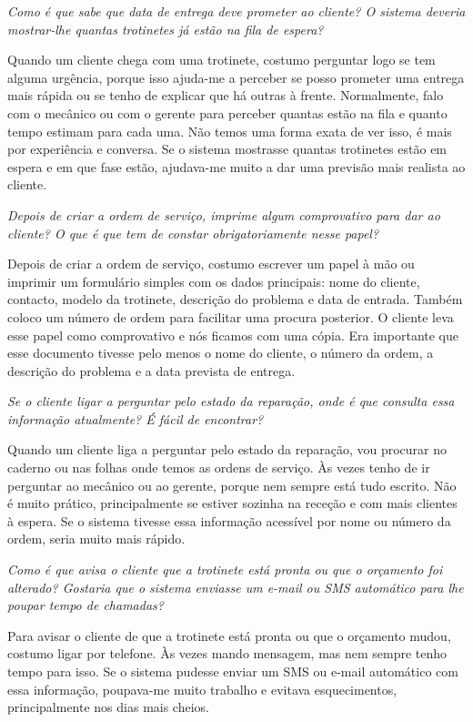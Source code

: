 \documentclass[11pt,a4paper]{article}
\newcommand{\pergunta}[1]{\item[P:] \textit{#1}}
\newcommand{\resposta}[1]{\item[R:] #1}
\begin{document}
\begin{transcription}
		\pergunta{Como é que sabe que data de entrega deve prometer ao cliente? O sistema deveria mostrar-lhe quantas trotinetes já estão na fila de espera?}
		\resposta{Quando um cliente chega com uma trotinete, costumo perguntar logo se tem alguma urgência, porque isso ajuda-me a perceber se posso prometer uma entrega mais rápida ou se tenho de explicar que há outras à frente. Normalmente, falo com o mecânico ou com o gerente para perceber quantas estão na fila e quanto tempo estimam para cada uma. Não temos uma forma exata de ver isso, é mais por experiência e conversa. Se o sistema mostrasse quantas trotinetes estão em espera e em que fase estão, ajudava-me muito a dar uma previsão mais realista ao cliente.}
		
		\pergunta{Depois de criar a ordem de serviço, imprime algum comprovativo para dar ao cliente? O que é que tem de constar obrigatoriamente nesse papel?}
		\resposta{Depois de criar a ordem de serviço, costumo escrever um papel à mão ou imprimir um formulário simples com os dados principais: nome do cliente, contacto, modelo da trotinete, descrição do problema e data de entrada. Também coloco um número de ordem para facilitar uma procura posterior. O cliente leva esse papel como comprovativo e nós ficamos com uma cópia. Era importante que esse documento tivesse pelo menos o nome do cliente, o número da ordem, a descrição do problema e a data prevista de entrega.}
		
		\pergunta{Se o cliente ligar a perguntar pelo estado da reparação, onde é que consulta essa informação atualmente? É fácil de encontrar?}
		\resposta{Quando um cliente liga a perguntar pelo estado da reparação, vou procurar no caderno ou nas folhas onde temos as ordens de serviço. Às vezes tenho de ir perguntar ao mecânico ou ao gerente, porque nem sempre está tudo escrito. Não é muito prático, principalmente se estiver sozinha na receção e com mais clientes à espera. Se o sistema tivesse essa informação acessível por nome ou número da ordem, seria muito mais rápido.}
		
		\pergunta{Como é que avisa o cliente que a trotinete está pronta ou que o orçamento foi alterado? Gostaria que o sistema enviasse um e-mail ou SMS automático para lhe poupar tempo de chamadas?}
		\resposta{Para avisar o cliente de que a trotinete está pronta ou que o orçamento mudou, costumo ligar por telefone. Às vezes mando mensagem, mas nem sempre tenho tempo para isso. Se o sistema pudesse enviar um SMS ou e-mail automático com essa informação, poupava-me muito trabalho e evitava esquecimentos, principalmente nos dias mais cheios.}
		

\end{transcription}
\end{document}
